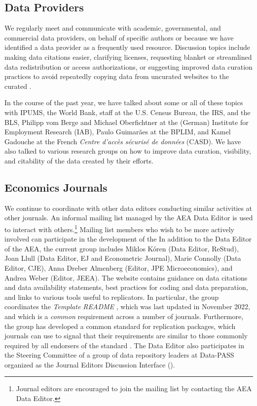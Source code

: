 \subsection{Data Providers}
\label{sec:producers}

We regularly meet and communicate with academic, governmental, and commercial data providers, on behalf of specific authors or because we have identified a data provider as a frequently used resource. Discussion topics include making data citations easier, clarifying licenses, requesting blanket or streamlined data redistribution or access authorizations, or suggesting improved data curation practices to avoid repeatedly copying data from uncurated websites to the curated \aeadcr{}. 

In the course of the past year, we have talked about some or all of these topics with IPUMS, the World Bank, staff at the U.S. Census Bureau, the \ac{IRS}, and the \ac{BLS}, Philipp vom Berge and Michael Oberfichtner at the (German) Institute for Employment Research (IAB), Paulo Guimarães at the \ac{BPLIM},  and Kamel Gadouche  at the French \textit{Centre d'accès sécurisé de données} (CASD). We have also talked to various research groups on how to improve data curation, visibility, and citability of the data created by their efforts. 

\subsection{Economics Journals}

We continue to coordinate with other data editors conducting similar activities at other journals. An informal mailing list managed by the AEA Data Editor is used to interact with others.\footnote{Journal editors are encouraged to join the mailing list by contacting the AEA Data Editor.} Mailing list members who wish to be more actively involved can participate in the development of the  In addition to the Data Editor of the AEA, the current group includes Miklos Kóren (Data Editor, \acl{ReStud}), Joan Llull (Data Editor, \acl{EJ} and Econometric Journal), Marie Connolly (Data Editor, \acl{CJE}), Anna Dreber Almenberg (Editor, JPE Microeconomics), and Andrea Weber (Editor, \acl{JEEA}). The website contains guidance on data citations and data availability statements, best practices for coding and data preparation, and links to various tools useful to replicators. In particular, the group coordinates the \textit{Template README} \citep{READMEv1.1.0}, which was last updated in November 2022, and which is a \textit{common} requirement across a number of journals. Furthermore, the group has developed a common standard for replication packages, which journals can use to signal that their requirements are similar to those commonly required by all endorsers of the standard \citep{datacodestandardv1}. The Data Editor  also  participates in  the Steering Committee of a group of data repository leaders at Data-PASS organized as the Journal Editors Discussion Interface ().


